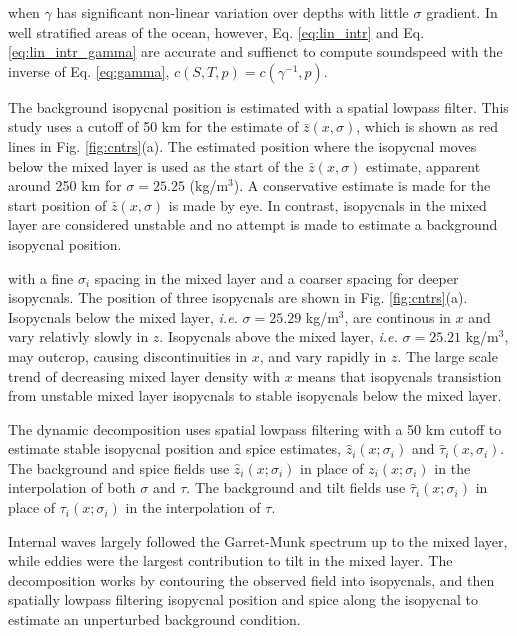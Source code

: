 \documentclass[preprint,NumberedRefs]{JASA}
\begin{document}
when $\gamma$ has significant non-linear variation over depths with little $\sigma$ gradient. In well stratified areas of the ocean, however, Eq. \ref{eq:lin_intr} and Eq. \ref{eq:lin_intr_gamma} are accurate and suffienct to compute soundspeed with the inverse of Eq. \eqref{eq:gamma}, $c(S, T, p)=c(\gamma^{-1}, p)$.

 The background isopycnal position is estimated with a spatial lowpass filter. This study uses a cutoff of 50 km for the estimate of $\bar{z}(x, \sigma)$, which is shown as red lines in Fig. \ref{fig:cntrs}(a). The estimated position where the isopycnal moves below the mixed layer is used as the start of the $\bar{z}(x, \sigma)$ estimate, apparent around 250 km for $\sigma=25.25$ (kg/m$^3$). A conservative estimate is made for the start position of $\bar{z}(x, \sigma)$ is made by eye. In contrast, isopycnals in the mixed layer are considered unstable and no attempt is made to estimate a background isopycnal position.

with a fine $\sigma_i$ spacing in the mixed layer and a coarser spacing for deeper isopycnals. The position of three isopycnals are shown in Fig. \ref{fig:cntrs}(a). Isopycnals below the mixed layer, \emph{i.e.} $\sigma = 25.29$ kg/m$^3$, are continous in $x$ and vary relativly slowly in $z$. Isopycnals above the mixed layer, \emph{i.e.} $\sigma = 25.21$ kg/m$^3$, may outcrop, causing discontinuities in $x$, and vary rapidly in $z$. The large scale trend of decreasing mixed layer density with $x$ means that isopycnals transistion from unstable mixed layer isopycnals to stable isopycnals below the mixed layer.

The dynamic decomposition uses spatial lowpass filtering with a 50 km cutoff to estimate stable isopycnal position and spice estimates, $\hat{z}_i(x; \sigma_i)$ and $\hat{\tau}_i(x, \sigma_i)$. The background and spice fields use $\hat{z}_i(x; \sigma_i)$ in place of $z_i(x; \sigma_i)$ in the interpolation of both $\sigma$ and $\tau$. The background and tilt fields use $\hat{\tau}_i(x; \sigma_i)$ in place of $\tau_i(x; \sigma_i)$ in the interpolation of $\tau$.

 Internal waves largely followed the Garret-Munk spectrum up to the mixed layer, while eddies were the largest contribution to tilt in the mixed layer.  The decomposition works by contouring the observed field into isopycnals, and then spatially lowpass filtering isopycnal position and spice along the isopycnal to estimate an unperturbed background condition.
\end{document}
